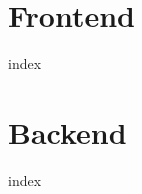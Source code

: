 


    \def\booktitle{\huge\bfseries 2021 Web Application Essentials}
    \def\version{October 20, 2021}
    
    \part{Frontend}\label{part:frontend}
    {index}
    \part{Backend}\label{part:backend}
    {index}

